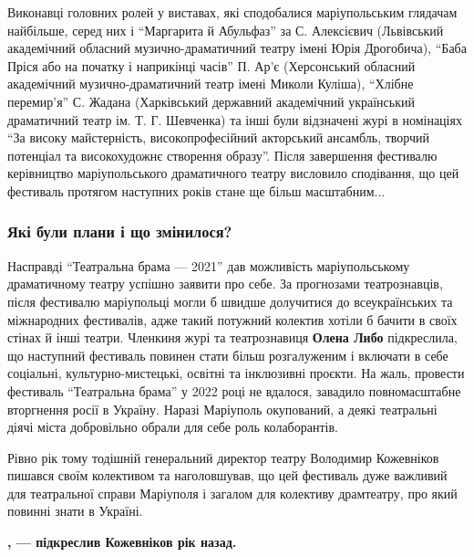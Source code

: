 
Виконавці головних ролей у виставах, які сподобалися маріупольським глядачам
найбільше, серед них і \enquote{Маргарита й Абульфаз} за С. Алексієвич (Львівський
академічний обласний музично-драматичний театру імені Юрія Дрогобича), \enquote{Баба
Пріся або на початку і наприкінці часів} П. Ар'є (Херсонський обласний
академічний музично-драматичний театр імені Миколи Куліша), \enquote{Хлібне перемир'я}
С. Жадана (Харківський державний академічний український драматичний театр ім.
Т. Г. Шевченка) та інші були відзначені журі в номінаціях \enquote{За високу
майстерність, високопрофесійний акторський ансамбль, творчий потенціал та
високохудожнє створення образу}. Після завершення фестивалю керівництво
маріупольського драматичного театру висловило сподівання, що цей фестиваль
протягом наступних років стане ще більш масштабним...


\subsubsection{Які були плани і що змінилося?}

Насправді \enquote{Театральна брама — 2021} дав можливість маріупольському драматичному
театру успішно заявити про себе. За прогнозами театрознавців, після фестивалю
маріупольці могли б швидше долучитися до всеукраїнських та міжнародних
фестивалів, адже такий потужний колектив хотіли б бачити в своїх стінах й інші
театри. Членкиня журі та театрознавиця \textbf{Олена Либо} підкреслила, що наступний
фестиваль повинен стати більш розгалуженим і включати в себе соціальні,
культурно-мистецькі, освітні та інклюзивні проєкти. На жаль, провести фестиваль
\enquote{Театральна брама} у 2022 році не вдалося, завадило повномасштабне вторгнення
росії в Україну. Наразі Маріуполь окупований, а деякі театральні діячі міста
добровільно обрали для себе роль колаборантів.

Рівно рік тому тодішній генеральний директор театру Володимир Кожевніков
пишався своїм колективом та наголовшував, що цей фестиваль дуже важливий для
театральної справи Маріуполя і загалом для колективу драмтеатру, про який
повинні знати в Україні. 

\begin{leftbar}
	\begingroup
		\bfseries
{}, — підкреслив Кожевніков рік назад. 
	\endgroup
\end{leftbar}

